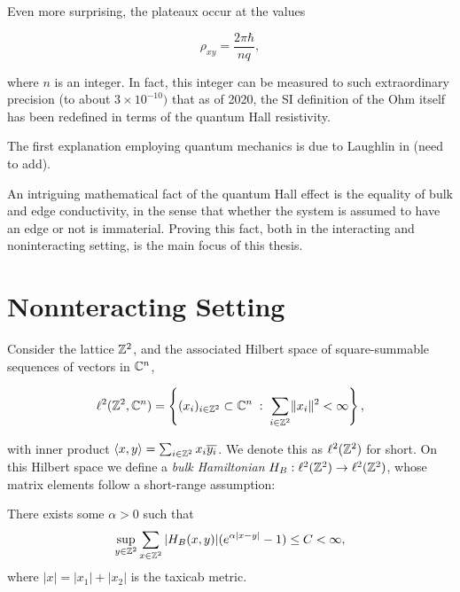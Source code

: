 \documentclass[12pt, letterpaper]{article}
\begin{document}
Even more surprising, the plateaux occur at the values

\[\rho_{xy} = \frac{2\pi \hbar}{nq},\]

where $n$ is an integer. In fact, this integer can be measured to such extraordinary precision (to about $3\times10^{-10})$ that as of 2020, the SI definition of the Ohm itself has been redefined in terms of the quantum Hall resistivity.

The first explanation employing quantum mechanics is due to Laughlin in (need to add). 

An intriguing mathematical fact of the quantum Hall effect is the equality of bulk and edge conductivity, in the sense that whether the system is assumed to have an edge or not is immaterial. Proving this fact, both in the interacting and noninteracting setting, is the main focus of this thesis.

\section{Nonnteracting Setting}

Consider the lattice $\mathbb{Z}^2$, and the associated Hilbert space of square-summable sequences of vectors in $\mathbb{C}^n$,

\[\ell^2(\mathbb{Z}^2, \mathbb{C}^n) = \left\{ (x_i)_{i\in\mathbb{Z}^2} \subset \mathbb{C}^n \; : \; \sum_{i \in \mathbb{Z}^2} \lVert x_i \rVert^2 < \infty \right\},\]

with inner product $\langle x, y\rangle = \sum_{i\in\mathbb{Z}^2} x_i\overline{y_i}$. We denote this as $\ell^2(\mathbb{Z}^2)$ for short. On this Hilbert space we define a \emph{bulk Hamiltonian} $H_B:\ell^2(\mathbb{Z}^2)\to\ell^2(\mathbb{Z}^2)$, whose matrix elements follow a short-range assumption:



\begin{assumption}
There exists some $\alpha>0$ such that
\[\sup_{y\in\mathbb{Z}^2}\sum_{x\in\mathbb{Z}^2}|H_B(x,y)|(e^{\alpha|x-y|}-1) \leq C < \infty,\]
where $|x| = |x_1|+|x_2|$ is the taxicab metric.
\label{ass:shortrange}
\end{assumption}



\end{document}
